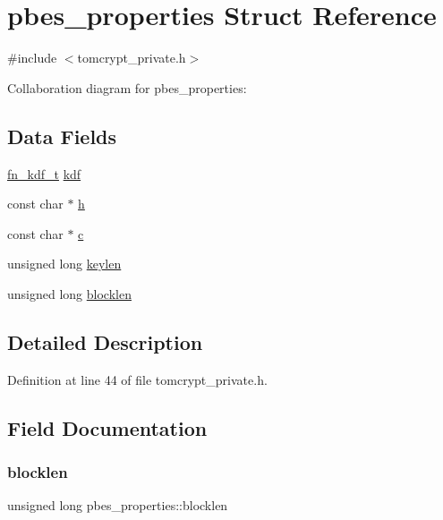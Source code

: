 \hypertarget{structpbes__properties}{}\section{pbes\+\_\+properties Struct Reference}
\label{structpbes__properties}


{\ttfamily \#include $<$tomcrypt\+\_\+private.\+h$>$}



Collaboration diagram for pbes\+\_\+properties\+:
\subsection*{Data Fields}
\begin{DoxyCompactItemize}
\item 
\mbox{\hyperlink{tomcrypt__private_8h_a056acfa9f8dfc66d7ebbe1315389f3b2}{fn\+\_\+kdf\+\_\+t}} \mbox{\hyperlink{structpbes__properties_a6edc1f4ee556a89b6812d0be927b1547}{kdf}}
\item 
const char $\ast$ \mbox{\hyperlink{structpbes__properties_ae2a9b6e73cee94acd3d082641c2b6ea8}{h}}
\item 
const char $\ast$ \mbox{\hyperlink{structpbes__properties_a821664389b9d7c6de99aeb7593beb48c}{c}}
\item 
unsigned long \mbox{\hyperlink{structpbes__properties_ad29dce0a2ea0da6e3007fbf220383ae4}{keylen}}
\item 
unsigned long \mbox{\hyperlink{structpbes__properties_a62ec0e2217643f5e3a52684b067f5dc2}{blocklen}}
\end{DoxyCompactItemize}


\subsection{Detailed Description}


Definition at line 44 of file tomcrypt\+\_\+private.\+h.



\subsection{Field Documentation}
\mbox{\label{structpbes__properties_a62ec0e2217643f5e3a52684b067f5dc2}} 
\subsubsection{\texorpdfstring{blocklen}{blocklen}}
{\footnotesize\ttfamily unsigned long pbes\+\_\+properties\+::blocklen}



